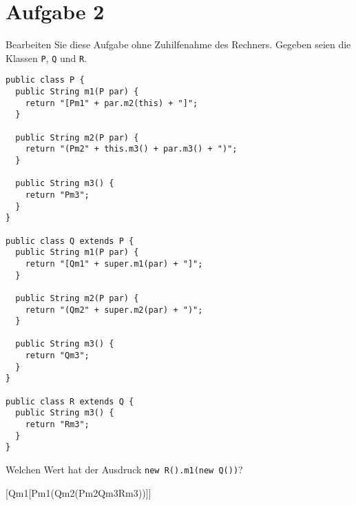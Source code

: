 \section{Aufgabe 2}
Bearbeiten Sie diese Aufgabe ohne Zuhilfenahme des Rechners. Gegeben seien die
Klassen \lstinline{P}, \lstinline{Q} und \lstinline{R}.

\begin{lstlisting}
public class P {
  public String m1(P par) {
    return "[Pm1" + par.m2(this) + "]";
  }

  public String m2(P par) {
    return "(Pm2" + this.m3() + par.m3() + ")";
  }

  public String m3() {
    return "Pm3";
  }
}

public class Q extends P {
  public String m1(P par) {
    return "[Qm1" + super.m1(par) + "]";
  }

  public String m2(P par) {
    return "(Qm2" + super.m2(par) + ")";
  }

  public String m3() {
    return "Qm3";
  }
}

public class R extends Q {
  public String m3() {
    return "Rm3";
  }
}
\end{lstlisting}

Welchen Wert hat der Ausdruck \lstinline{new R().m1(new Q())}?

[Qm1[Pm1(Qm2(Pm2Qm3Rm3))]]